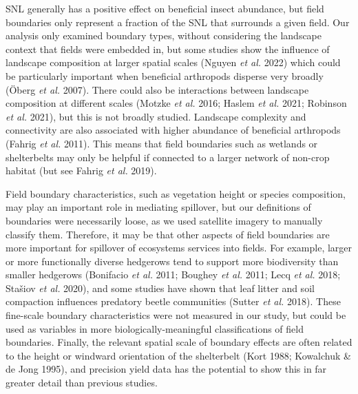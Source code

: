 \documentclass[]{elsarticle} %
\begin{document}
SNL generally has a positive effect on beneficial insect abundance, but field boundaries only represent a fraction of the SNL that surrounds a given field.
Our analysis only examined boundary types, without considering the landscape context that fields were embedded in, but some studies show the influence of landscape composition at larger spatial scales (Nguyen \emph{et al.} 2022) which could be particularly important when beneficial arthropods disperse very broadly (Öberg \emph{et al.} 2007).
There could also be interactions between landscape composition at different scales (Motzke \emph{et al.} 2016; Haslem \emph{et al.} 2021; Robinson \emph{et al.} 2021), but this is not broadly studied.
Landscape complexity and connectivity are also associated with higher abundance of beneficial arthropods (Fahrig \emph{et al.} 2011).
This means that field boundaries such as wetlands or shelterbelts may only be helpful if connected to a larger network of non-crop habitat (but see Fahrig \emph{et al.} 2019).

Field boundary characteristics, such as vegetation height or species composition, may play an important role in mediating spillover, but our definitions of boundaries were necessarily loose, as we used satellite imagery to manually classify them.
Therefore, it may be that other aspects of field boundaries are more important for spillover of ecosystems services into fields.
For example, larger or more functionally diverse hedgerows tend to support more biodiversity than smaller hedgerows (Bonifacio \emph{et al.} 2011; Boughey \emph{et al.} 2011; Lecq \emph{et al.} 2018; Stašiov \emph{et al.} 2020), and some studies have shown that leaf litter and soil compaction influences predatory beetle communities (Sutter \emph{et al.} 2018).
These fine-scale boundary characteristics were not measured in our study, but could be used as variables in more biologically-meaningful classifications of field boundaries.
Finally, the relevant spatial scale of boundary effects are often related to the height or windward orientation of the shelterbelt (Kort 1988; Kowalchuk \& de Jong 1995), and precision yield data has the potential to show this in far greater detail than previous studies.
\end{document}
